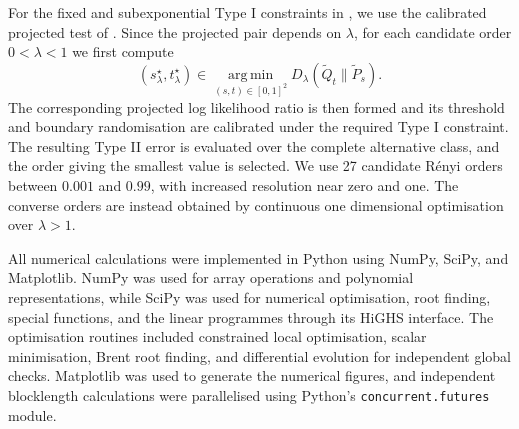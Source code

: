 \documentclass[journal,10pt,draftclsnofoot,onecolumn]{IEEEtran}
\begin{document}
For the fixed and subexponential Type I constraints in , we use the calibrated projected test of . Since the projected pair depends on $\lambda$, for each candidate order $0<\lambda<1$ we first compute
\begin{equation*} 
(s_\lambda^\star,t_\lambda^\star) \in \operatorname*{arg\,min}_{(s,t)\in[0,1]^2} D_\lambda(\widetilde Q_t\|\widetilde P_s).
\end{equation*} 
The corresponding projected log likelihood ratio is then formed and its threshold and boundary randomisation are calibrated under the required Type I constraint. The resulting Type II error is evaluated over the complete alternative class, and the order giving the smallest value is selected. We use 27 candidate R\'enyi orders between $0.001$ and $0.99$, with increased resolution near zero and one. The converse orders are instead obtained by continuous one dimensional optimisation over $\lambda>1$.


All numerical calculations were implemented in Python using NumPy, SciPy, and Matplotlib. NumPy was used for array operations and polynomial representations, while SciPy was used for numerical optimisation, root finding, special functions, and the linear programmes through its HiGHS interface. The optimisation routines included constrained local optimisation, scalar minimisation, Brent root finding, and differential evolution for independent global checks. Matplotlib was used to generate the numerical figures, and independent blocklength calculations were parallelised using Python's \texttt{concurrent.futures} module.



\end{document}
